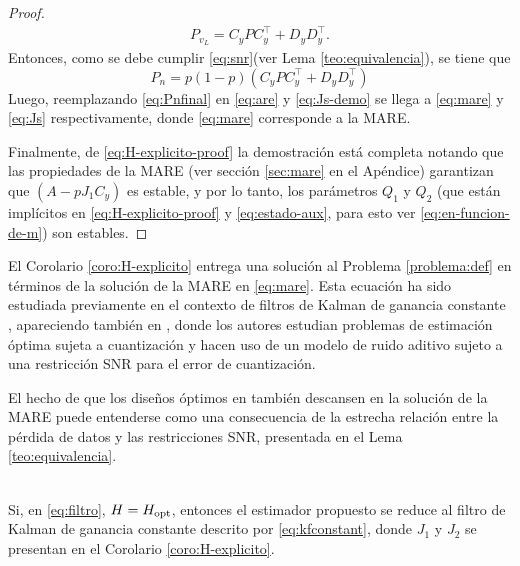 \begin{proof}{\ \\}
\begin{align}\label{eq:PvL-1}
P_{v_L} = C_y PC_y^{\intercal} + D_yD_y^{\intercal}.
\end{align}
Entonces, como se debe cumplir \eqref{eq:snr}(ver Lema \ref{teo:equivalencia}), se tiene que 
\begin{equation}\label{eq:Pnfinal}
P_n=p(1-p)\left(C_y PC_y^{\intercal} + D_yD_y^{\intercal}\right)
\end{equation}
Luego, reemplazando \eqref{eq:Pnfinal} en \eqref{eq:are} y \eqref{eq:Js-demo} se llega a  \eqref{eq:mare} y \eqref{eq:Js} respectivamente, donde \eqref{eq:mare} corresponde a la MARE.

Finalmente, de \eqref{eq:H-explicito-proof} la demostraci\'on est\'a completa notando que las propiedades de la MARE \cite{schenato2008optimal} (ver secci\'on \ref{sec:mare} en el Ap\'endice) garantizan que $(A-pJ_1C_y)$ es estable, y por lo tanto, los par\'ametros $Q_1$ y $Q_2$ (que est\'an impl\'icitos en \eqref{eq:H-explicito-proof} y \eqref{eq:estado-aux}, para esto ver \eqref{eq:en-funcion-de-m}) son estables.
\QED
\end{proof}

El Corolario \ref{coro:H-explicito} entrega una soluci\'on al Problema \ref{problema:def} en t\'erminos de la soluci\'on de la MARE en \eqref{eq:mare}. Esta ecuaci\'on ha sido estudiada previamente en el contexto de filtros de Kalman de ganancia constante \cite{schenato2008optimal}, apareciendo tambi\'en en \cite{flrago07}, donde los autores estudian problemas de estimaci\'on \'optima sujeta a cuantizaci\'on y hacen uso de un modelo de ruido aditivo sujeto a una restricci\'on SNR para el error de cuantizaci\'on.

El hecho de que los dise\~nos \'optimos en \cite{flrago07} tambi\'en descansen en la soluci\'on de la MARE puede entenderse como una consecuencia de la estrecha relaci\'on entre la p\'erdida de datos y las restricciones SNR, presentada en el Lema \ref{teo:equivalencia}.

\begin{coro}{\ \\}
Si, en \eqref{eq:filtro}, $H=H_{\operatorname{opt}}$, entonces el estimador propuesto se reduce al filtro de Kalman de ganancia constante descrito por \eqref{eq:kfconstant}, donde $J_1$ y $J_2$ se presentan en el Corolario \ref{coro:H-explicito}.
\end{coro}

